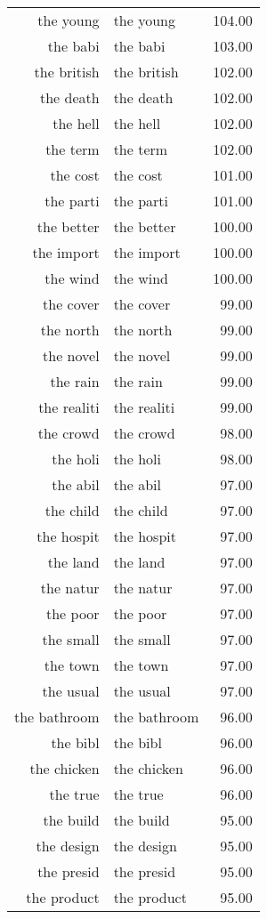 \begin{table}[ht]
\begin{tabular}{rlr}
  the young & the young & 104.00 \\ 
  the babi & the babi & 103.00 \\ 
  the british & the british & 102.00 \\ 
  the death & the death & 102.00 \\ 
  the hell & the hell & 102.00 \\ 
  the term & the term & 102.00 \\ 
  the cost & the cost & 101.00 \\ 
  the parti & the parti & 101.00 \\ 
  the better & the better & 100.00 \\ 
  the import & the import & 100.00 \\ 
  the wind & the wind & 100.00 \\ 
  the cover & the cover & 99.00 \\ 
  the north & the north & 99.00 \\ 
  the novel & the novel & 99.00 \\ 
  the rain & the rain & 99.00 \\ 
  the realiti & the realiti & 99.00 \\ 
  the crowd & the crowd & 98.00 \\ 
  the holi & the holi & 98.00 \\ 
  the abil & the abil & 97.00 \\ 
  the child & the child & 97.00 \\ 
  the hospit & the hospit & 97.00 \\ 
  the land & the land & 97.00 \\ 
  the natur & the natur & 97.00 \\ 
  the poor & the poor & 97.00 \\ 
  the small & the small & 97.00 \\ 
  the town & the town & 97.00 \\ 
  the usual & the usual & 97.00 \\ 
  the bathroom & the bathroom & 96.00 \\ 
  the bibl & the bibl & 96.00 \\ 
  the chicken & the chicken & 96.00 \\ 
  the true & the true & 96.00 \\ 
  the build & the build & 95.00 \\ 
  the design & the design & 95.00 \\ 
  the presid & the presid & 95.00 \\ 
  the product & the product & 95.00 \\ 

\end{tabular}
\end{table}

